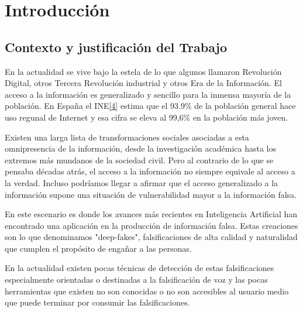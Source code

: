 \section{Introducción}

\subsection{Contexto y justificación del Trabajo}



En la actualidad se vive bajo la estela de lo que algunos llamaron Revolución Digital, otros Tercera Revolución industrial y otros Era de la Información. El acceso a la información es generalizado y sencillo para la inmensa mayoría de la población. En España el INE\hyperref[RI_4]{[4]} estima que el 93.9\% de la población general hace uso regunal de Internet y esa cifra se eleva al 99,6\% en la población más joven.

Existen una larga lista de transformaciones sociales asociadas a esta omnipresencia de la información, desde la investigación académica hasta los extremos más mundanos de la sociedad civil. Pero al contrario de lo que se pensaba décadas atrás, el acceso a la información no siempre equivale al acceso a la verdad. Incluso podríamos llegar a afirmar que el acceso generalizado a la información supone una situación de vulnerabilidad mayor a la información falsa.

En este escenario es donde los avances más recientes en Inteligencia Artificial han encontrado una aplicación en la producción de información falsa. Estas creaciones son lo que denominamos "deep-fakes", falsificaciones de alta calidad y naturalidad que cumplen el propósito de engañar a las personas.

En la actualidad existen pocas técnicas de detección de estas falsificaciones especialmente orientadas o destinadas a la falsificación de voz y las pocas herramientas que existen no son conocidas o no son accesibles al usuario medio que puede terminar por consumir las falsificaciones.

